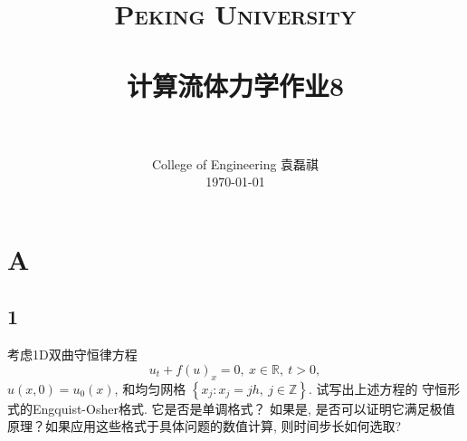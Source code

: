 \documentclass[12pt]{article}
\title{
		\vspace{-1in} 	
		\usefont{OT1}{bch}{b}{n}
		\normalfont \normalsize \textsc{\LARGE Peking University}\\[0.2cm] %
		\horrule{0.5pt} \\[0.2cm]
		\huge \bfseries{计算流体力学作业8} \\[-0.2cm]
		\horrule{2pt} \\[0.2cm]
}
\author{
		\normalfont 								\normalsize
		College of Engineering \quad 2001111690  \quad 袁磊祺\\	\normalsize
        \today
}
\date{}
\begin{document}


\maketitle

\section{A}

\subsection{1}

考虑1D双曲守恒律方程
\begin{equation}
	u_{t}+f(u)_{x}=0,\ x \in \mathbb{R},\ t>0,
\end{equation}
$u(x, 0)=u_{0}(x)$, 和均匀网格 $\left\{x_{j}: x_{j}=j h,\ j \in \mathbb{Z}\right\} .$ 试写出上述方程的
守恒形式的Engquist-Osher格式. 它是否是单调格式？ 如果是, 是否可以证明它满足极值原理？如果应用这些格式于具体问题的数值计算,
则时间步长如何选取?
\end{document}
